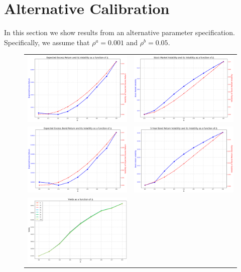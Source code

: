 \section{Alternative Calibration}
In this section we show results from an alternative parameter specification. Specifically, we assume that $\rho^a = 0.001$ and $\rho^b = 0.05$. 

\begin{figure}[htbp]
\centering
\vspace{0.1in}
\begin{tabular}{cc}
\includegraphics[width=.4\textwidth]{figures/APUnconditionalExcessReturnsJFEALT.png} &
\includegraphics[width=.4\textwidth]{figures/APUnconditionalStockMarketVolatilityJFEALT.png} \\
\includegraphics[width=.4\textwidth]{figures/ExRBond5yearJFEALT.png} &
\includegraphics[width=.4\textwidth]{figures/BondVola5yearJFEALT.png} \\
\includegraphics[width=.4\textwidth]{figures/UnconditionalYieldsJFEALT.png} &

\end{tabular}
\end{figure}
